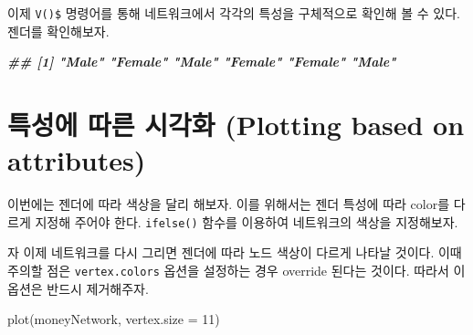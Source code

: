\documentclass[
]{book}
\newenvironment{Shaded}{\begin{snugshade}}{\end{snugshade}}
\newcommand{\AttributeTok}[1]{\textcolor[rgb]{0.77,0.63,0.00}{#1}}
\newcommand{\DecValTok}[1]{\textcolor[rgb]{0.00,0.00,0.81}{#1}}
\newcommand{\DocumentationTok}[1]{\textcolor[rgb]{0.56,0.35,0.01}{\textbf{\textit{#1}}}}
\newcommand{\FunctionTok}[1]{\textcolor[rgb]{0.00,0.00,0.00}{#1}}
\newcommand{\NormalTok}[1]{#1}
\newcommand{\OtherTok}[1]{\textcolor[rgb]{0.56,0.35,0.01}{#1}}
\newcommand{\SpecialCharTok}[1]{\textcolor[rgb]{0.00,0.00,0.00}{#1}}
\newcommand{\StringTok}[1]{\textcolor[rgb]{0.31,0.60,0.02}{#1}}
\begin{document}
이제 \texttt{V()\$} 명령어를 통해 네트워크에서 각각의 특성을 구체적으로 확인해 볼 수 있다. 젠더를 확인해보자.

\begin{Shaded}
\end{Shaded}

\begin{Shaded}
\begin{Highlighting}[]
\DocumentationTok{\#\# [1] "Male"   "Female" "Male"   "Female" "Female" "Male"}
\end{Highlighting}
\end{Shaded}

\hypertarget{uxd2b9uxc131uxc5d0-uxb530uxb978-uxc2dcuxac01uxd654-plotting-based-on-attributes}{%
\section{특성에 따른 시각화 (Plotting based on attributes)}\label{uxd2b9uxc131uxc5d0-uxb530uxb978-uxc2dcuxac01uxd654-plotting-based-on-attributes}}

이번에는 젠더에 따라 색상을 달리 해보자. 이를 위해서는 젠더 특성에 따라 color를 다르게 지정해 주어야 한다. \texttt{ifelse()} 함수를 이용하여 네트워크의 색상을 지정해보자.

\begin{Shaded}
\end{Shaded}

자 이제 네트워크를 다시 그리면 젠더에 따라 노드 색상이 다르게 나타날 것이다. 이때 주의할 점은 \texttt{vertex.colors} 옵션을 설정하는 경우 override 된다는 것이다. 따라서 이 옵션은 반드시 제거해주자.

\begin{Shaded}
\begin{Highlighting}[]
\FunctionTok{plot}\NormalTok{(moneyNetwork, }\AttributeTok{vertex.size =} \DecValTok{11}\NormalTok{)}
\end{Highlighting}
\end{Shaded}
\end{document}

